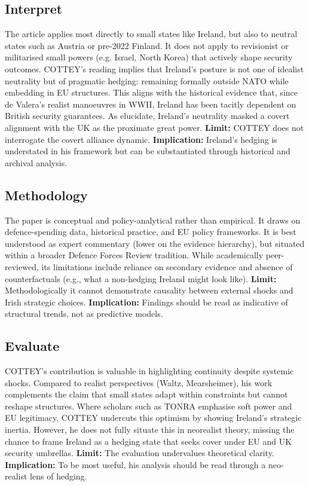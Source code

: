 \subsection*{Interpret}
The article applies most directly to small states like Ireland, but also to neutral states such as Austria or pre-2022 Finland. It does not apply to revisionist or militarised small powers (e.g. Israel, North Korea) that actively shape security outcomes. COTTEY’s reading implies that Ireland’s posture is not one of idealist neutrality but of pragmatic hedging: remaining formally outside NATO while embedding in EU structures. This aligns with the historical evidence that, since de Valera’s realist manoeuvres in WWII, Ireland has been tacitly dependent on British security guarantees. As \parencite{FANNING_2015,AYIOTIS_2023} elucidate, Ireland’s neutrality masked a covert alignment with the UK as the proximate great power.  
\textbf{Limit:} COTTEY does not interrogate the covert alliance dynamic.  
\textbf{Implication:} Ireland’s hedging is understated in his framework but can be substantiated through historical and archival analysis.

\subsection*{Methodology}
The paper is conceptual and policy-analytical rather than empirical. It draws on defence-spending data, historical practice, and EU policy frameworks. It is best understood as expert commentary (lower on the evidence hierarchy), but situated within a broader Defence Forces Review tradition. While academically peer-reviewed, its limitations include reliance on secondary evidence and absence of counterfactuals (e.g., what a non-hedging Ireland might look like).  
\textbf{Limit:} Methodologically it cannot demonstrate causality between external shocks and Irish strategic choices.  
\textbf{Implication:} Findings should be read as indicative of structural trends, not as predictive models.

\subsection*{Evaluate}
COTTEY’s contribution is valuable in highlighting continuity despite systemic shocks. Compared to realist perspectives (Waltz, Mearsheimer), his work complements the claim that small states adapt within constraints but cannot reshape structures. Where scholars such as TONRA emphasise soft power and EU legitimacy, COTTEY undercuts this optimism by showing Ireland’s strategic inertia. However, he does not fully situate this in neorealist theory, missing the chance to frame Ireland as a hedging state that seeks cover under EU and UK security umbrellas.  
\textbf{Limit:} The evaluation undervalues theoretical clarity.  
\textbf{Implication:} To be most useful, his analysis should be read through a neo-realist lens of hedging.

